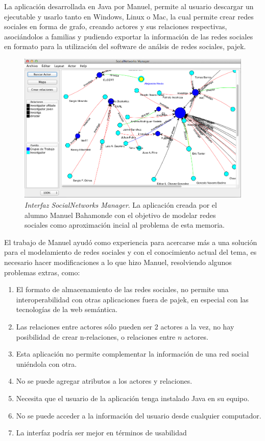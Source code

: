 La aplicación desarrollada en Java por Manuel, permite al usuario descargar un ejecutable y usarlo tanto en Windows, Linux o Mac, la cual permite crear redes sociales en forma de grafo, creando actores y sus relaciones respectivas, asociándolos a familias y pudiendo exportar la información de las redes sociales en formato para la utilización del software de análsis de redes sociales, pajek\cite{pajek}.

\begin{figure}[H]
  \includegraphics[width=1.0\textwidth]{images/memoria_manuel.png}
  \caption[Interfaz SocialNetworks Manager]{\emph{Interfaz SocialNetworks Manager}. La aplicación creada por el alumno Manuel Bahamonde con el objetivo de modelar redes sociales como aproximación incial al problema de esta memoria.}
  \label{memoria_manuel}
\end{figure}

El trabajo de Manuel ayudó como experiencia para acercarse más a una solución para el modelamiento de redes sociales y con el conocimiento actual del tema, es necesario hacer modificaciones a lo que hizo Manuel, resolviendo algunos problemas extras, como:

  \begin{enumerate}
    \item El formato de almacenamiento de las redes sociales, no permite una interoperabilidad con otras aplicaciones fuera de pajek\cite{pajek}, en especial con las tecnologías de la web semántica.
    \item Las relaciones entre actores sólo pueden ser 2 actores a la vez, no hay posibilidad de crear n-relaciones, o relaciones entre $n$ actores.
    \item Esta aplicación no permite complementar la información de una red social uniéndola con otra.
    \item No se puede agregar atributos a los actores y relaciones.
    \item Necesita que el usuario de la aplicación tenga instalado Java en su equipo.
    \item No se puede acceder a la información del usuario desde cualquier computador.
    \item La interfaz podría ser mejor en términos de usabilidad
  \end{enumerate}

